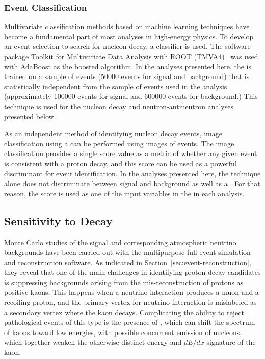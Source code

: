 \subsubsection{Event Classification}

Multivariate classification methods based on machine learning techniques have become a fundamental part of most analyses in high-energy physics. 
To develop an event selection to search for nucleon decay, a 
classifier is used. The software package Toolkit for Multivariate Data Analysis with ROOT (TMVA4)~\cite{Hocker:2007ht}
was used with AdaBoost as the boosted algorithm.  In the analyses presented here, the  is trained on a sample of  events (\num{50000} events for signal and background) that is statistically independent from the sample of  events used in the analysis (approximately \num{100000} events for signal and \num{600000} events for background.)  This technique is used for the nucleon decay and neutron-antineutron analyses presented below.

As an independent method of identifying nucleon decay events, image classification using a 
can be performed using \twod images of   events. The image classification provides a single score value as a metric of whether any given event is consistent with a proton decay, and this score can be used as a powerful discriminant for event identification.  In the analyses presented here, the  technique alone does not discriminate between signal and background as well as a .  For that reason, the  score is used as one of the input variables in the  in each analysis.

\subsection{Sensitivity to \ptoknubar Decay}
\label{subsec:nonaccel-ndk-nubarkplus}

Monte Carlo studies of the \ptoknubar signal and corresponding atmospheric neutrino backgrounds have been carried out with the  multipurpose full event simulation and reconstruction software.  As indicated in Section~\ref{sec:event-reconstruction},
they reveal that one of the main challenges in identifying proton decay candidates is suppressing backgrounds arising from the mis-reconstruction of protons as positive kaons. This happens when a  neutrino interaction produces a muon and a recoiling proton, and the primary vertex for neutrino interaction is mislabeled as a secondary vertex where the kaon decays.  Complicating the ability to reject pathological events of this type is the presence of , which can shift the spectrum of kaons toward low energies, with possible concurrent emission of nucleons, which together weaken the otherwise distinct energy and $dE/dx$ signature of the kaon. 

